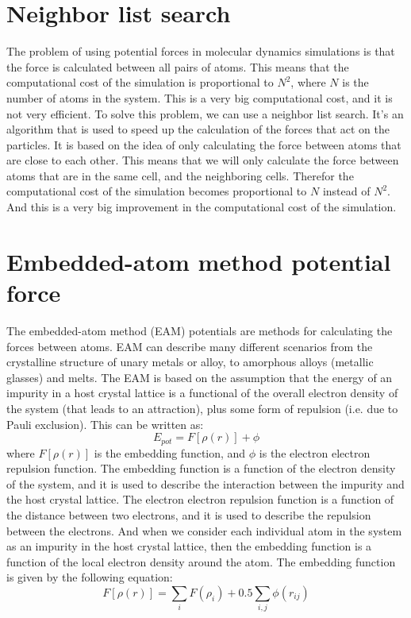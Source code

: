 \section{Neighbor list search}
    The problem of using potential forces in molecular dynamics simulations is that the force is calculated between all pairs of atoms. This means that the computational cost of the simulation is proportional to $N^2$, where $N$ is the number of atoms in the system. This is a very big computational cost, and it is not very efficient. 
    To solve this problem, we can use a neighbor list search. It's an algorithm that is used to speed up the calculation of the forces that act on the particles. 
    It is based on the idea of only calculating the force between atoms that are close to each other. This means that we will only calculate the force between atoms that are in the same cell, and the neighboring cells. Therefor the computational cost of the simulation becomes proportional to $N$ instead of $N^2$. And this is a very big improvement in the computational cost of the simulation. 
    
    

\section{Embedded-atom method potential force}
    The embedded-atom method (EAM) potentials are  methods for calculating the forces between atoms. EAM can describe many different scenarios from the crystalline structure of unary metals or alloy, to amorphous alloys (metallic glasses) and melts. The EAM is based on the assumption that the energy of an impurity in a host crystal lattice is a functional of the overall electron density of the system (that leads to an attraction), plus some form of repulsion (i.e. due to Pauli exclusion). This can be written as:
    \begin{equation}
        E_{pot} = F[\rho(r)] + \phi
    \end{equation}
    where $F[\rho(r)]$ is the embedding function, and $\phi$ is the electron electron repulsion function. The embedding function is a function of the electron density of the system, and it is used to describe the interaction between the impurity and the host crystal lattice.
    The electron electron repulsion function is a function of the distance between two electrons, and it is used to describe the repulsion between the electrons. And when we consider each individual atom in the system as an impurity in the host crystal lattice, then the embedding function is a function of the local electron density around the atom. The embedding function is given by the following equation:
    \begin{equation}
        F[\rho(r)] = \sum_{i} F(\rho_i) + 0.5\sum_{i,j} \phi(r_{ij})
    \end{equation}

